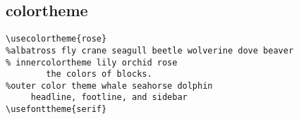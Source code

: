 \documentclass[11pt,oneside]{book}
\begin{document}
\begin{common-format}
\section{colortheme}
\begin{Verbatim}
\usecolortheme{rose}
%albatross fly crane seagull beetle wolverine dove beaver
% innercolortheme lily orchid rose       
        the colors of blocks. 
%outer color theme whale seahorse dolphin     
     headline, footline, and sidebar
\usefonttheme{serif}
\end{Verbatim}



\end{common-format}
\end{document}
